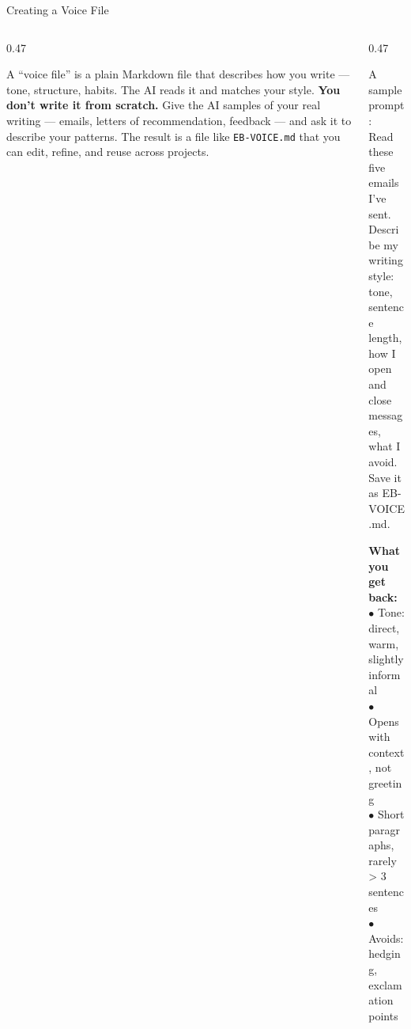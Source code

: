 \documentclass[aspectratio=169, 10pt]{beamer}
\begin{document}
\begin{frame}[fragile]{Creating a Voice File}
\begin{columns}[T]
\begin{column}{0.47\textwidth}
\begin{tcolorbox}[accentbox]
\small
A ``voice file'' is a plain Markdown file that describes how you write --- tone, structure, habits. The AI reads it and matches your style.
\vskip4pt
\textbf{You don't write it from scratch.} Give the AI samples of your real writing --- emails, letters of recommendation, feedback --- and ask it to describe your patterns.
\vskip4pt
The result is a file like \texttt{EB-VOICE.md} that you can edit, refine, and reuse across projects.
\end{tcolorbox}
\end{column}
\begin{column}{0.47\textwidth}
\begin{tcolorbox}[colback=DarkSlate, colframe=DarkSlate, arc=3pt, left=6pt, right=6pt, top=4pt, bottom=4pt]
{\color{CoolGray}\ttfamily\tiny A sample prompt:\\[2pt]
\color{white}\scriptsize
Read these five emails I've sent.\\
Describe my writing style: tone,\\
sentence length, how I open and\\
close messages, what I avoid.\\
Save it as EB-VOICE.md.
}
\end{tcolorbox}
\vskip3pt
\begin{tcolorbox}[quotebox, top=3pt, bottom=3pt]
\small
\textbf{What you get back:}\\[2pt]
{\scriptsize $\bullet$ Tone: direct, warm, slightly informal\\
$\bullet$ Opens with context, not greeting\\
$\bullet$ Short paragraphs, rarely > 3 sentences\\
$\bullet$ Avoids: hedging, exclamation points}
\end{tcolorbox}
\end{column}
\end{columns}
\end{frame}
\end{document}
